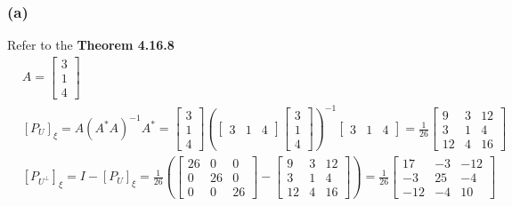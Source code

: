 \documentclass{article}
\begin{document}
\subsubsection*{(a)}
Refer to the \textbf{Theorem 4.16.8}
\begin{equation*}
    \begin{split}
        &A = \begin{bmatrix}
            3 \\
            1 \\
            4 
        \end{bmatrix}\\
        &[P_U]_\xi = A(A^*A)^{-1}A^* = \begin{bmatrix}
            3 \\
            1 \\
            4  
        \end{bmatrix} (\begin{bmatrix}
            3 & 1 & 4 
        \end{bmatrix} \begin{bmatrix}
            3 \\
            1 \\
            4 
        \end{bmatrix})^{-1} \begin{bmatrix}
            3 & 1 & 4 
        \end{bmatrix} = \frac{1}{26}\begin{bmatrix}
                9 & 3 & 12 \\
                3 & 1 & 4 \\
                12 & 4 & 16
        \end{bmatrix} \\
        & [P_{U^{\bot}}]_\xi = I - [P_U]_\xi = \frac{1}{26}(\begin{bmatrix}
            26 & 0 & 0 \\
            0 & 26 & 0 \\
            0 & 0 & 26 
    \end{bmatrix} - \begin{bmatrix}
        9 & 3 & 12 \\
        3 & 1 & 4 \\
        12 & 4 & 16
        \end{bmatrix}) = \frac{1}{26} \begin{bmatrix}
            17 & -3 & -12 \\
            -3 & 25 & -4 \\
            -12 & -4 & 10 
    \end{bmatrix}
    \end{split}
\end{equation*}
\end{document}
